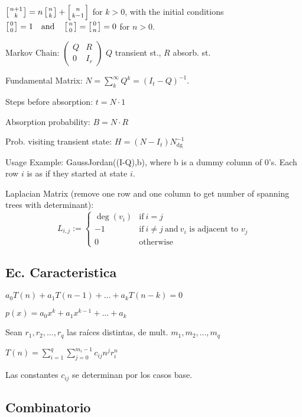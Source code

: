 {$\left[{n+1\atop k}\right] = n \left[{n\atop k}\right] + \left[{n\atop k-1}\right]$
for $k > 0$, with the initial conditions
$\left[{0\atop 0}\right] = 1 \quad\mbox{and}\quad \left[{n\atop 0}\right]=\left[{0\atop n}\right]=0$
for $n > 0$.

Markov Chain: $\begin{pmatrix}
Q & R \\ 
0 & I_r
\end{pmatrix}$ $Q$ transient st., $R$ absorb. st. 

Fundamental Matrix: $N = \sum_{k}^{\infty} Q^k = (I_t-Q)^{-1}$. 

Steps before absorption: $t = N \cdot 1$

Absorption probability: $B = N \cdot R$

Prob. visiting transient state: $H = (N - I_t) N_{\operatorname{dg}}^{-1}$

Usage Example: GaussJordan((I-Q),b), where b is a dummy column of 0's. Each row $i$ is as if they started at state $i$.

Laplacian Matrix (remove one row and one column to get number of spanning trees with determinant):
$$L_{i,j}:=
\begin{cases}
\deg(v_i) & \mbox{if}\ i = j \\
-1 & \mbox{if}\ i \neq j\ \mbox{and}\ v_i \mbox{ is adjacent to } v_j \\
0 & \mbox{otherwise}
\end{cases}$$

}%
\subsection{Ec. Caracteristica}
$a_0T(n)+a_1T(n-1)+...+a_kT(n-k)=0$

$p(x)=a_0 x^k + a_1 x^{k-1} + ... + a_k$

Sean $r_1,r_2,...,r_q$ las raíces distintas, de mult. $m_1, m_2, ..., m_q$

$T(n)=\sum_{i=1}^q{\sum_{j=0}^{m_i - 1}c_{ij} n^j r_i^n}$

Las constantes $c_{ij}$ se determinan por los casos base.
\subsection{Combinatorio}

